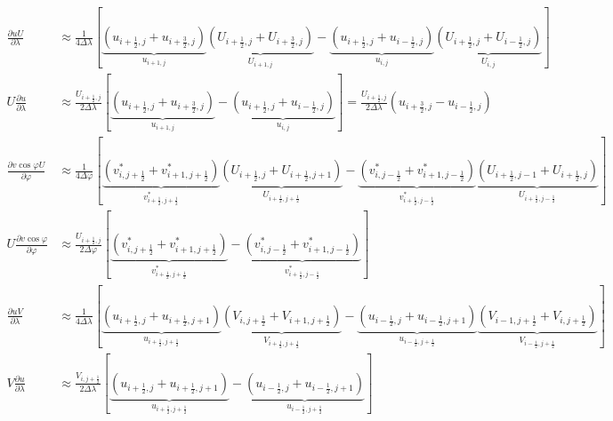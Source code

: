 \documentclass{ctexart}
\begin{document}
\begin{align}
  \frac{\partial u U}{\partial \lambda} & \approx \frac{1}{4 \Delta{\lambda}} \left[ \underbrace{\left( u_{i+\frac{1}{2},j} + u_{i+\frac{3}{2},j} \right)}_{u_{i+1,j}} \underbrace{\left( U_{i+\frac{1}{2},j} + U_{i+\frac{3}{2},j} \right)}_{U_{i+1,j}} - \underbrace{\left( u_{i+\frac{1}{2},j} + u_{i-\frac{1}{2},j} \right)}_{u_{i,j}} \underbrace{\left( U_{i+\frac{1}{2},j} + U_{i-\frac{1}{2},j} \right)}_{U_{i,j}} \right] \nonumber \\
  U \frac{\partial u}{\partial \lambda} & \approx \frac{U_{i+\frac{1}{2},j}}{2 \Delta{\lambda}} \left[ \underbrace{\left( u_{i+\frac{1}{2},j} + u_{i+\frac{3}{2},j} \right)}_{u_{i+1,j}} - \underbrace{\left( u_{i+\frac{1}{2},j} + u_{i-\frac{1}{2},j} \right)}_{u_{i,j}} \right] = \frac{U_{i+\frac{1}{2},j}}{2 \Delta{\lambda}} \left( u_{i+\frac{3}{2},j} - u_{i-\frac{1}{2},j} \right) \nonumber \\
  \frac{\partial v \cos{\varphi} U}{\partial \varphi} & \approx \frac{1}{4 \Delta{\varphi}} \left[ \underbrace{\left( v_{i,j+\frac{1}{2}}^* + v_{i+1,j+\frac{1}{2}}^* \right)}_{v_{i+\frac{1}{2},j+\frac{1}{2}}^*} \underbrace{\left( U_{i+\frac{1}{2},j} + U_{i+\frac{1}{2},j+1} \right)}_{U_{i+\frac{1}{2},j+\frac{1}{2}}} - \underbrace{\left( v_{i,j-\frac{1}{2}}^* + v_{i+1,j-\frac{1}{2}}^* \right)}_{v_{i+\frac{1}{2},j-\frac{1}{2}}^*} \underbrace{\left( U_{i+\frac{1}{2},j-1} + U_{i+\frac{1}{2},j} \right)}_{U_{i+\frac{1}{2},j-\frac{1}{2}}} \right] \nonumber \\
  U \frac{\partial v \cos{\varphi}}{\partial \varphi} & \approx \frac{U_{i+\frac{1}{2},j}}{2 \Delta{\varphi}} \left[ \underbrace{\left( v_{i,j+\frac{1}{2}}^* + v_{i+1,j+\frac{1}{2}}^* \right)}_{v_{i+\frac{1}{2},j+\frac{1}{2}}^*} - \underbrace{\left( v_{i,j-\frac{1}{2}}^* + v_{i+1,j-\frac{1}{2}}^* \right)}_{v_{i+\frac{1}{2},j-\frac{1}{2}}^*} \right] \nonumber \\
  \frac{\partial u V}{\partial \lambda} & \approx \frac{1}{4 \Delta{\lambda}} \left[ \underbrace{\left( u_{i+\frac{1}{2},j} + u_{i+\frac{1}{2},j+1} \right)}_{u_{i+\frac{1}{2},j+\frac{1}{2}}} \underbrace{\left( V_{i,j+\frac{1}{2}} + V_{i+1,j+\frac{1}{2}} \right)}_{V_{i+\frac{1}{2},j+\frac{1}{2}}} - \underbrace{\left( u_{i-\frac{1}{2},j} + u_{i-\frac{1}{2},j+1} \right)}_{u_{i-\frac{1}{2},j+\frac{1}{2}}} \underbrace{\left( V_{i-1,j+\frac{1}{2}} + V_{i,j+\frac{1}{2}} \right)}_{V_{i-\frac{1}{2},j+\frac{1}{2}}} \right] \nonumber \\
  V \frac{\partial u}{\partial \lambda} & \approx \frac{V_{i,j+\frac{1}{2}}}{2 \Delta{\lambda}} \left[ \underbrace{\left( u_{i+\frac{1}{2},j} + u_{i+\frac{1}{2},j+1} \right)}_{u_{i+\frac{1}{2},j+\frac{1}{2}}} - \underbrace{\left( u_{i-\frac{1}{2},j} + u_{i-\frac{1}{2},j+1} \right)}_{u_{i-\frac{1}{2},j+\frac{1}{2}}} \right] \nonumber \\

\end{align}
\end{document}
